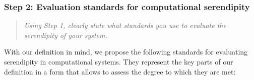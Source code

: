 \subsubsection*{Step 2: Evaluation standards for computational serendipity}
\begin{quote} {\em Using Step 1, clearly state what standards you use to evaluate the serendipity of your
    system. }\end{quote}

\noindent With our definition in mind, we propose the following standards for evaluating serendipity in computational systems. They represent the key parts of our definition in a form that allows to assess the degree to which they are met:


